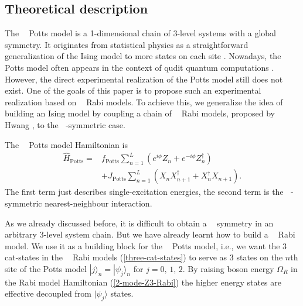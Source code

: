 \documentclass[reprint, aps, prx, amsmath, amssymb, longbibliography, superscriptaddress]{revtex4-2}
\DeclareMathOperator{\Zthree}{\mathbb{Z}_3}
\DeclareMathOperator{\Ztwo}{\mathbb{Z}_2}
\begin{document}
\subsection{Theoretical description}
\label{theoretical-potts}


The $\Zthree$ Potts model \cite{wu_potts_1982} is a 1-dimensional chain of $3$-level systems with a global $\Zthree$ symmetry. It  originates from statistical physics as a straightforward generalization of the Ising model to more states on each site \cite{wu_potts_1982,baxter_critical_1982}. Nowadays, the Potts model often appears in the context of qudit quantum computations \cite{aharonov_polynomial_2007,okada_efficient_2019}. However, the direct experimental realization of the Potts model still does not exist. One of the goals of this paper is to propose such an experimental realization based on $\Zthree$ Rabi models. To achieve this, we generalize the idea of building an Ising model by coupling a chain of $\Ztwo$ Rabi models, proposed by Hwang \cite{hwang_largescale_2013}, to the $\Zthree$-symmetric case.

The $\Zthree$ Potts model Hamiltonian is
\begin{equation}
\begin{aligned}
\label{potts-hamiltonian}
  \hat H_{\text{Potts}} =& f_{\text{Potts}} \sum\limits_{n=1}^L \left(e^{i\phi}Z_n + e^{-i\phi}Z_n^{\dagger}\right) \\
  &+  J_{\text{Potts}} \sum\limits_{n=1}^L \left( X_n X_{n+1}^{\dagger} + X_n^{\dagger} X_{n+1}\right). 
\end{aligned}
\end{equation}
The first term just describes single-excitation energies, the second term is the $\Zthree$-symmetric nearest-neighbour interaction.

As we already discussed before, it is difficult to obtain a $\Zthree$ symmetry in an arbitrary $3$-level system chain. But we have already learnt how to build a $\Zthree$ Rabi model. We use it as a building block for the $\Zthree$ Potts model, i.e., we want the 3 cat-states in the $\Zthree$ Rabi models (\ref{three-cat-states}) to serve as 3 states on the $n$th site of the Potts model $ |j\rangle_n = |\psi_j\rangle_n $ for $j=0,\, 1,\, 2$. By raising boson energy $\Omega_R$ in the Rabi model Hamiltonian (\ref{2-mode-Z3-Rabi}) the higher energy states are effective decoupled from $|\psi_j\rangle$ states.
\end{document}
